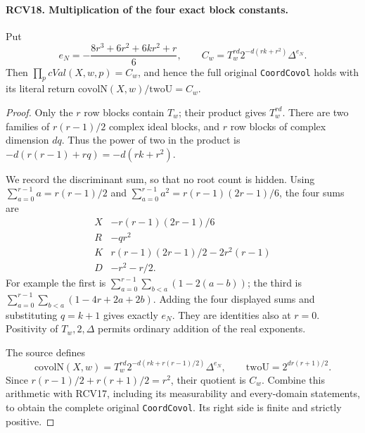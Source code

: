 \paragraph{RCV18. Multiplication of the four exact block constants.}
\label{claim:RCV18}
Put
\[
 e_N=-\frac{8r^3+6r^2+6kr^2+r}{6},\qquad
 C_w=T_w^{rd}2^{-d(rk+r^2)}\Delta^{e_N}.
\tag{RCV.32}
\]
Then \(\prod_p cVal(X,w,p)=C_w\), and hence the full
original \texttt{CoordCovol} holds with its literal return
\(\mathrm{covolN}(X,w)/\mathrm{twoU}=C_w\).
\begin{proof}
Only the \(r\) row blocks contain \(T_w\); their product gives
\(T_w^{rd}\).  There are two families of \(r(r-1)/2\)
complex ideal blocks, and \(r\) row blocks of complex dimension
\(dq\).  Thus the power of two in the product is
\(-d(r(r-1)+rq)=-d(rk+r^2)\).

We record the discriminant sum, so that no root count is hidden.
Using \(\sum_{a=0}^{r-1}a=r(r-1)/2\) and
\(\sum_{a=0}^{r-1}a^2=r(r-1)(2r-1)/6\), the four sums are
\[
\begin{array}{c|c}
 X&-r(r-1)(2r-1)/6\\
 R&-qr^2\\
 K&r(r-1)(2r-1)/2-2r^2(r-1)\\
 D&-r^2-r/2.
\end{array}
\tag{RCV.33}
\]
For example the first is
\(\sum_{a=0}^{r-1}\sum_{b<a}(1-2(a-b))\); the third is
\(\sum_{a=0}^{r-1}\sum_{b<a}(1-4r+2a+2b)\).
Adding the four displayed sums and substituting \(q=k+1\)
gives exactly \(e_N\).  They are identities also at \(r=0\).
Positivity of \(T_w,2,\Delta\) permits ordinary addition of
the real exponents.

The source defines
\[
 \mathrm{covolN}(X,w)
 =T_w^{rd}2^{-d(rk+r(r-1)/2)}\Delta^{e_N},\qquad
 \mathrm{twoU}=2^{dr(r+1)/2}.
\]
Since \(r(r-1)/2+r(r+1)/2=r^2\), their quotient is \(C_w\).
Combine this arithmetic with RCV17, including its measurability
and every-domain statements, to obtain the complete original
\texttt{CoordCovol}.  Its right side is finite and strictly positive.
\end{proof}

